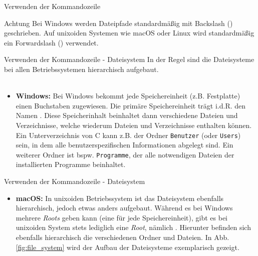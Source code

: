     \begin{frame}{Verwenden der Kommandozeile}
        \begin{alertblock}{Achtung}
            Bei Windows werden Dateipfade standardmäßig mit Backslash (\code{\textbackslash{}}) geschrieben. Auf unixoiden Systemen wie macOS oder Linux wird standardmäßig ein Forwardslash (\code{/}) verwendet.
        \end{alertblock}
    \end{frame}
    
    \begin{frame}{Verwenden der Kommandozeile - Dateisystem}
        In der Regel sind die Dateisysteme bei allen Betriebssystemen hierarchisch aufgebaut. \\~\
        
        \begin{itemize}
            \item \textbf{Windows:} Bei Windows bekommt jede Speichereinheit (z.B. Festplatte) einen Buchstaben zugewiesen. Die primäre Speichereinheit trägt i.d.R. den Namen . Diese Speicherinhalt beinhaltet dann verschiedene Dateien und Verzeichnisse, welche wiederum Dateien und Verzeichnisse enthalten können. Ein Unterverzeichnis von C kann z.B. der Ordner \texttt{Benutzer} (oder \texttt{Users}) sein, in dem alle benutzerspezifischen Informationen abgelegt sind. Ein weiterer Ordner ist bspw. \texttt{Programme}, der alle notwendigen Dateien der installierten Programme beinhaltet.
        \end{itemize}
    \end{frame}
    
    \begin{frame}{Verwenden der Kommandozeile - Dateisystem}
       
        \begin{itemize}
            \item \textbf{macOS:} In unixoiden Betriebssystem ist das Dateisystem ebenfalls hierarchisch, jedoch etwas anders aufgebaut. Während es bei Windows mehrere \textit{Roots} geben kann (eine für jede Speichereinheit), gibt es bei unixoiden System stets lediglich eine \textit{Root}, nämlich \code{/}. Hierunter befinden sich ebenfalls hierarchisch die verschiedenen Ordner und Dateien. In Abb. \ref{fig:file_system} wird der Aufbau der Dateisysteme exemplarisch gezeigt.
        \end{itemize}
    \end{frame}
    
